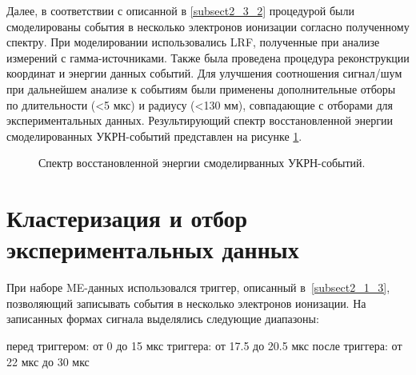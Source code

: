 Далее, в соответствии с описанной в \ref{subsect2_3_2} процедурой были смоделированы события в несколько электронов ионизации согласно полученному спектру. При моделировании использовались LRF, полученные при анализе измерений с гамма-источниками. Также была проведена процедура реконструкции координат и энергии данных событий. Для улучшения соотношения сигнал/шум при дальнейшем анализе к событиям были применены дополнительные отборы по длительности (<5 мкс) и радиусу (<130 мм), совпадающие с отборами для экспериментальных данных. Результирующий спектр восстановленной энергии смоделированных УКРН-событий представлен на рисунке \ref{img:cevnscpectrumspe}. 
\begin{figure}[H]
	\caption{Спектр восстановленной энергии смоделирванных УКРН-событий.}
	\label{img:cevnscpectrumspe}
\end{figure}


\section{Кластеризация и отбор экспериментальных данных}
\label{sect4_2}
При наборе ME-данных использовался триггер, описанный в~\ref{subsect2_1_3}, позволяющий записывать события в несколько электронов ионизации. На записанных формах сигнала выделялись следующие диапазоны:
\begin{itemize}
     перед триггером: от 0 до 15 мкс
     триггера: от 17.5 до 20.5 мкс
     после триггера: от 22 мкс до 30 мкс
\end{itemize}

